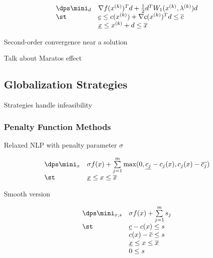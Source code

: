 \begin{equation}
\label{eq:qp-subproblem}
\begin{array}{lll} \dps
\mini_d & \nabla f(x^{(k)})^T d + \frac{1}{2} d^T W_1(x^{(k)}, \lambda^{(k)}) d \\
\st 	& \underline{c} \le c(x^{(k)}) + \nabla c(x^{(k)})^T d \le \overline{c} \\
		& \underline{x} \le x^{(k)} + d \le \overline{x} \\
\end{array}
\end{equation}

Second-order convergence near a solution

Talk about Maratos effect

\subsection{Globalization Strategies}

Strategies handle infeasibility

\subsubsection{Penalty Function Methods}
Relaxed NLP with penalty parameter $\sigma$

\begin{equation}
\begin{array}{ll} \dps
\mini_x & \sigma f(x) + \sum\limits_{j = 1}^m \max(0, \underline{c_j} - c_j(x), c_j(x) - \overline{c_j}) \\
\st 	& \underline{x} \le x \le \overline{x} \\
\end{array}
\end{equation}

Smooth version

\begin{equation}
\begin{array}{ll} \dps
\mini_{x,s} & \sigma f(x) + \sum\limits_{j = 1}^m s_j \\
\st 		& \underline{c} - c(x) \le s \\
			& c(x) - \overline{c} \le s \\
			& \underline{x} \le x \le \overline{x} \\
			& 0 \le s \\
\end{array}
\end{equation}

